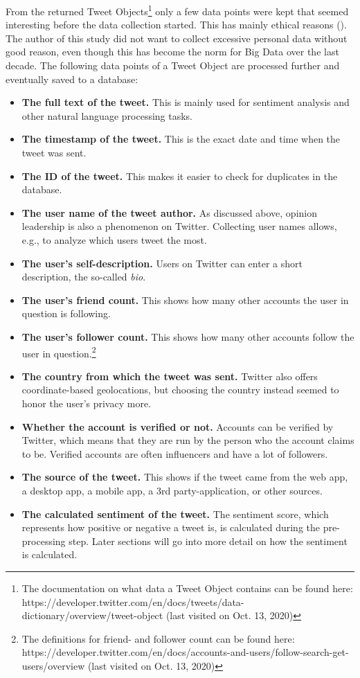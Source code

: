 From the returned Tweet Objects\footnote{The documentation on what data a Tweet Object contains can be found here: https://developer.twitter.com/en/docs/tweets/data-dictionary/overview/tweet-object (last visited on Oct. 13, 2020)} only a few data points were kept that seemed interesting before the data collection started. This has mainly ethical reasons (\cite{richards2014big}). The author of this study did not want to collect excessive personal data without good reason, even though this has become the norm for Big Data over the last decade. The following data points of a Tweet Object are processed further and eventually saved to a database:

\begin{itemize}
\item \textbf{The full text of the tweet.} This is mainly used for sentiment analysis and other natural language processing tasks.
\item \textbf{The timestamp of the tweet.} This is the exact date and time when the tweet was sent.
\item \textbf{The ID of the tweet.} This makes it easier to check for duplicates in the database. 
\item \textbf{The user name of the tweet author.} As discussed above, opinion leadership is also a phenomenon on Twitter. Collecting user names allows, e.g., to analyze which users tweet the most.
\item \textbf{The user's self-description.} Users on Twitter can enter a short description, the so-called \emph{bio}.
\item \textbf{The user's friend count.} This shows how many other accounts the user in question is following.
\item \textbf{The user's follower count.} This shows how many other accounts follow the user in question.\footnote{The definitions for friend- and follower count can be found here: https://developer.twitter.com/en/docs/accounts-and-users/follow-search-get-users/overview (last visited on Oct. 13, 2020)}
\item \textbf{The country from which the tweet was sent.} Twitter also offers coordinate-based geolocations, but choosing the country instead seemed to honor the user's privacy more.
\item \textbf{Whether the account is verified or not.} Accounts can be verified by Twitter, which means that they are run by the person who the account claims to be. Verified accounts are often influencers and have a lot of followers.
\item \textbf{The source of the tweet.} This shows if the tweet came from the web app, a desktop app, a mobile app, a 3rd party-application, or other sources.
\item \textbf{The calculated sentiment of the tweet.} The sentiment score, which represents how positive or negative a tweet is, is calculated during the pre-processing step. Later sections will go into more detail on how the sentiment is calculated.
\end{itemize}

